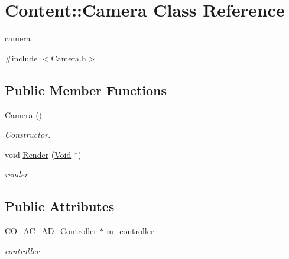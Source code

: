\hypertarget{classContent_1_1Camera}{
\section{Content::Camera Class Reference}
\label{classContent_1_1Camera}
}


camera  


{\ttfamily \#include $<$Camera.h$>$}\subsection*{Public Member Functions}
\begin{DoxyCompactItemize}
\item 
\hypertarget{classContent_1_1Camera_a24fdd7d9cbdb7784b298367225317b22}{
\hyperlink{classContent_1_1Camera_a24fdd7d9cbdb7784b298367225317b22}{Camera} ()}
\label{classContent_1_1Camera_a24fdd7d9cbdb7784b298367225317b22}

\begin{DoxyCompactList}\small\item\em Constructor. \item\end{DoxyCompactList}\item 
\hypertarget{classContent_1_1Camera_ae81cbbeaa3b77ca4c6892500b91a7672}{
void \hyperlink{classContent_1_1Camera_ae81cbbeaa3b77ca4c6892500b91a7672}{Render} (\hyperlink{structVoid}{Void} $\ast$)}
\label{classContent_1_1Camera_ae81cbbeaa3b77ca4c6892500b91a7672}

\begin{DoxyCompactList}\small\item\em render \item\end{DoxyCompactList}\end{DoxyCompactItemize}
\subsection*{Public Attributes}
\begin{DoxyCompactItemize}
\item 
\hypertarget{classContent_1_1Camera_a9b9c0238a0fd504c0f77d7c9f53bfb6d}{
\hyperlink{classContent_1_1Actor_1_1Admin_1_1Controller}{CO\_\-AC\_\-AD\_\-Controller} $\ast$ \hyperlink{classContent_1_1Camera_a9b9c0238a0fd504c0f77d7c9f53bfb6d}{m\_\-controller}}
\label{classContent_1_1Camera_a9b9c0238a0fd504c0f77d7c9f53bfb6d}

\begin{DoxyCompactList}\small\item\em controller \item\end{DoxyCompactList}\end{DoxyCompactItemize}


